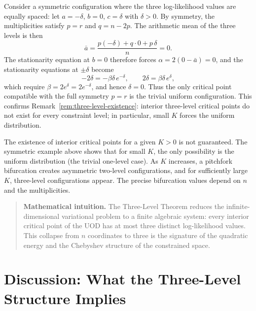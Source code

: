 \begin{example}
\label{ch:ex:three-level-symmetric}
Consider a symmetric configuration where the three log-likelihood values
are equally spaced: let \(a=-\delta\), \(b=0\), \(c=\delta\) with
\(\delta>0\).  By symmetry, the multiplicities satisfy \(p=r\) and
\(q=n-2p\).  The arithmetic mean of the three levels is then
\[
\bar a = \frac{p(-\delta)+q\cdot 0+p\,\delta}{n} = 0.
\]
The stationarity equation at \(b=0\) therefore forces
\(\alpha = 2(0-\bar a) = 0\), and the stationarity equations at
\(\pm\delta\) become
\[
-2\delta = -\beta\delta\,e^{-\delta}, \qquad
2\delta = \beta\delta\,e^{\delta},
\]
which require \(\beta = 2e^{\delta} = 2e^{-\delta}\), and hence
\(\delta=0\).  Thus the only critical point compatible with the full
symmetry \(p=r\) is the trivial uniform configuration.  This confirms
Remark~\ref{rem:three-level-existence}: interior three-level critical
points do not exist for every constraint level; in particular, small
\(K\) forces the uniform distribution.
\end{example}

\begin{remark}
\label{rem:three-level-existence}
The existence of interior critical points for a given \(K>0\) is not
guaranteed.  The symmetric example above shows that for small \(K\),
the only possibility is the uniform distribution (the trivial
one-level case).  As \(K\) increases, a pitchfork bifurcation creates
asymmetric two-level configurations, and for sufficiently large \(K\),
three-level configurations appear.  The precise bifurcation values
depend on \(n\) and the multiplicities.
\end{remark}

\begin{quote}
\textbf{Mathematical intuition.}
The Three-Level Theorem reduces the infinite-dimensional variational problem to a finite algebraic system: every interior critical point of the UOD has at most three distinct log-likelihood values.
This collapse from $n$ coordinates to three is the signature of the quadratic energy and the Chebyshev structure of the constrained space.
\end{quote}

\section{Discussion: What the Three-Level Structure Implies}\label{ch:sec:discussion-what-the-three-level-structure-implies}


